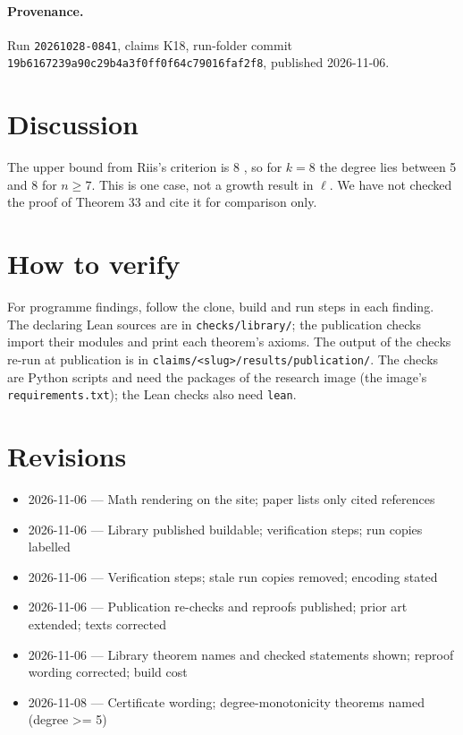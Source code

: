 \documentclass{article}
\begin{document}
\paragraph{Provenance.}
Run \texttt{20261028-0841}, claims K18, run-folder commit \texttt{19b6167239a90c29b4a3f0ff0f64c79016faf2f8}, published 2026-11-06.

\section{Discussion}

The upper bound from Riis's criterion is 8 \cite{riis1993independence,razborov2001php}, so for
$k=8$ the degree lies between 5 and 8 for $n\ge7$. This is one case, not a growth result in
$\ell$. We have not checked the proof of Theorem 33 and cite it for comparison only.

\section{How to verify}

For programme findings, follow the clone, build and run steps in each finding. The declaring Lean sources are in \texttt{checks/library/}; the publication checks import their modules and print each theorem's axioms. The output of the checks re-run at publication is in \texttt{claims/<slug>/results/publication/}. The checks are Python scripts and need the packages of the research image (the image's \texttt{requirements.txt}); the Lean checks also need \texttt{lean}.

\section{Revisions}

\begin{itemize}
\item 2026-11-06 --- Math rendering on the site; paper lists only cited references
\item 2026-11-06 --- Library published buildable; verification steps; run copies labelled
\item 2026-11-06 --- Verification steps; stale run copies removed; encoding stated
\item 2026-11-06 --- Publication re-checks and reproofs published; prior art extended; texts corrected
\item 2026-11-06 --- Library theorem names and checked statements shown; reproof wording corrected; build cost
\item 2026-11-08 --- Certificate wording; degree-monotonicity theorems named (degree \textgreater{}= 5)
\end{itemize}



\end{document}
